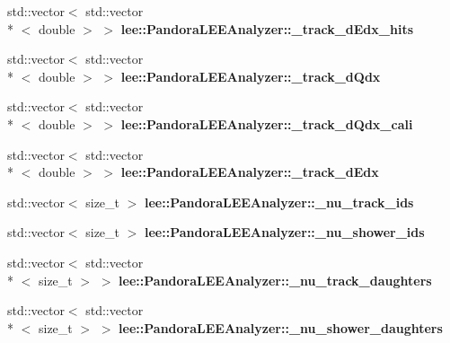 \begin{DoxyCompactItemize}
\item 
\hypertarget{group__lee_ga3ad01e55fc294c33fcff222f0efa2a1a}{std\-::vector$<$ std\-::vector\\*
$<$ double $>$ $>$ {\bfseries lee\-::\-Pandora\-L\-E\-E\-Analyzer\-::\-\_\-track\-\_\-d\-Edx\-\_\-hits}}\label{group__lee_ga3ad01e55fc294c33fcff222f0efa2a1a}

\item 
\hypertarget{group__lee_gab54b1be84b3a383b57e5b1c76b480d6b}{std\-::vector$<$ std\-::vector\\*
$<$ double $>$ $>$ {\bfseries lee\-::\-Pandora\-L\-E\-E\-Analyzer\-::\-\_\-track\-\_\-d\-Qdx}}\label{group__lee_gab54b1be84b3a383b57e5b1c76b480d6b}

\item 
\hypertarget{group__lee_gadcd255a2c652d64e4694c6b650839f43}{std\-::vector$<$ std\-::vector\\*
$<$ double $>$ $>$ {\bfseries lee\-::\-Pandora\-L\-E\-E\-Analyzer\-::\-\_\-track\-\_\-d\-Qdx\-\_\-cali}}\label{group__lee_gadcd255a2c652d64e4694c6b650839f43}

\item 
\hypertarget{group__lee_ga81034997677b254a8fa7fb9c090fa756}{std\-::vector$<$ std\-::vector\\*
$<$ double $>$ $>$ {\bfseries lee\-::\-Pandora\-L\-E\-E\-Analyzer\-::\-\_\-track\-\_\-d\-Edx}}\label{group__lee_ga81034997677b254a8fa7fb9c090fa756}

\item 
\hypertarget{group__lee_ga5253913419cf4211211558082106bd62}{std\-::vector$<$ size\-\_\-t $>$ {\bfseries lee\-::\-Pandora\-L\-E\-E\-Analyzer\-::\-\_\-nu\-\_\-track\-\_\-ids}}\label{group__lee_ga5253913419cf4211211558082106bd62}

\item 
\hypertarget{group__lee_ga063d4fec5b4b40b812147b1b77be79a3}{std\-::vector$<$ size\-\_\-t $>$ {\bfseries lee\-::\-Pandora\-L\-E\-E\-Analyzer\-::\-\_\-nu\-\_\-shower\-\_\-ids}}\label{group__lee_ga063d4fec5b4b40b812147b1b77be79a3}

\item 
\hypertarget{group__lee_gacb2657deb7fca8bcf8c97952d7a012cf}{std\-::vector$<$ std\-::vector\\*
$<$ size\-\_\-t $>$ $>$ {\bfseries lee\-::\-Pandora\-L\-E\-E\-Analyzer\-::\-\_\-nu\-\_\-track\-\_\-daughters}}\label{group__lee_gacb2657deb7fca8bcf8c97952d7a012cf}

\item 
\hypertarget{group__lee_ga4d78972623fa65077421a091e226f61f}{std\-::vector$<$ std\-::vector\\*
$<$ size\-\_\-t $>$ $>$ {\bfseries lee\-::\-Pandora\-L\-E\-E\-Analyzer\-::\-\_\-nu\-\_\-shower\-\_\-daughters}}\label{group__lee_ga4d78972623fa65077421a091e226f61f}


\end{DoxyCompactItemize}
